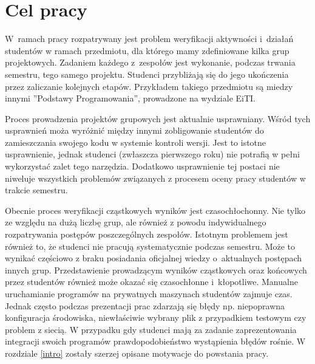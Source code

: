\chapter{Cel pracy}

W~ramach pracy rozpatrywany jest problem weryfikacji aktywności i~działań studentów w ramach przedmiotu, dla którego mamy zdefiniowane kilka grup projektowych.
Zadaniem każdego z~zespołów jest wykonanie, podczas trwania semestru, tego samego projektu.
Studenci przybliżają się do jego ukończenia przez zaliczanie kolejnych etapów.
Przykładem takiego przedmiotu są miedzy innymi ”Podstawy Programowania”, prowadzone na wydziale EiTI.

Proces prowadzenia projektów grupowych jest aktualnie usprawniany.
Wśród tych usprawnień moża wyróżnić między innymi zobligowanie studentów do zamieszczania swojego kodu w systemie kontroli wersji.
Jest to istotne usprawnienie, jednak studenci (zwłaszcza pierwszego roku) nie potrafią w pełni wykorzystać zalet tego narzędzia.
Dodatkowo usprawnienie tej postaci nie niweluje wszystkich problemów związanych z procesem oceny pracy studentów w trakcie semestru.

Obecnie proces weryfikacji cząstkowych wyników jest czasochłochonny.
Nie tylko ze względu na dużą liczbę grup, ale również z powodu indywidualnego rozpatrywania postępów poszczególnych zespołów.
Istotnym problemem jest również to, że studenci nie pracują systematycznie podczas semestru.
Może to wynikać częściowo z braku posiadania oficjalnej wiedzy o~aktualnych postępach innych grup.
Przedstawienie prowadzącym wyników cząstkowych oraz końcowych przez studentów również może okazać się czasochłonne i~kłopotliwe.
Manualne uruchamianie programów na prywatnych maszynach studentów zajmuje czas.
Jednak często podczas prezentacji prac zdarzają się błędy np. niepoprawna konfiguracja środowiska, niewłaściwie wybrany plik z przypadkiem testowym czy problem z siecią.
W przypadku gdy studenci mają za zadanie zaprezentowania integracji swoich programów prawdopodobieństwo wystąpienia błędów rośnie.
W rozdziale \ref{intro} zostały szerzej opisane motywacje do powstania pracy.

